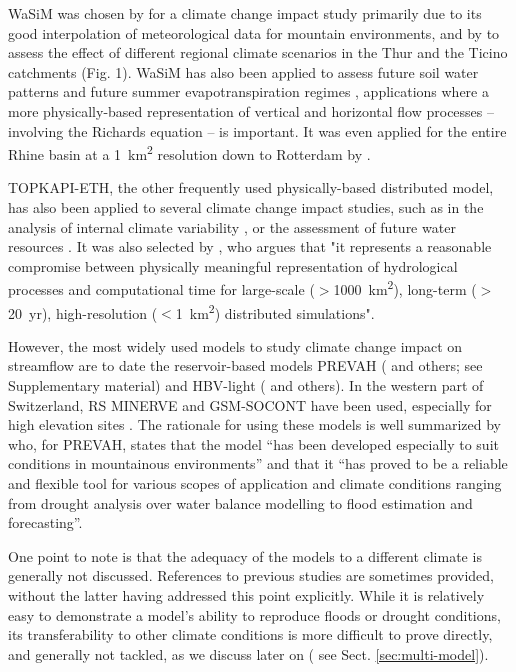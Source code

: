 \documentclass[10pt,a4paper]{article}
\begin{document}
WaSiM was chosen by \citet{Middelkoop2001} for a climate change impact study primarily due to its good interpolation of meteorological data for mountain environments, and by \citet{Jasper2004} to assess the effect of different regional climate scenarios in the Thur and the Ticino catchments (Fig. 1). WaSiM has also been applied to assess future soil water patterns \citep{Jasper2006, Rossler2012} and future summer evapotranspiration regimes \citep{Calanca2006}, applications where a more physically-based representation of vertical and horizontal flow processes -- involving the Richards equation -- is important. It was even applied for the entire Rhine basin at a 1~km\textsuperscript{2} resolution down to Rotterdam by \citet{Kleinn2005}.

TOPKAPI-ETH, the other frequently used physically-based distributed model, has also been applied to several climate change impact studies, such as in the analysis of internal climate variability \citep{Fatichi2014}, or the assessment of future water resources \citep{Finger2012}. It was also selected by \citet{Fatichi2015}, who argues that "it represents a reasonable compromise between physically meaningful representation of hydrological processes and computational time for large-scale ($>$1000~km\textsuperscript{2}), long-term ($>$20~yr), high-resolution ($<$1~km\textsuperscript{2}) distributed simulations".

However, the most widely used models to study climate change impact on streamflow are to date the reservoir-based models PREVAH (\citealt{Koplin2012, Speich2015, Milano2015a, Brunner2019c} and others;  see Supplementary material) and HBV-light (\citealt{Etter2017, Hakala2020, Brunner2018a, Jenicek2018}  and others). In the western part of Switzerland, RS MINERVE and GSM-SOCONT have been used, especially for high elevation sites \citep{Horton2006, Uhlmann2013a, Uhlmann2013b, Terrier2015}. The rationale for using these models is well summarized by \citet{Koplin2010} who, for PREVAH, states that the model ``has been developed especially to suit conditions in mountainous environments'' and that it ``has proved to be a reliable and flexible tool for various scopes of application and climate conditions ranging from drought analysis over water balance modelling to flood estimation and forecasting''. 

One point to note is that the adequacy of the models to a different climate is generally not discussed. References to previous studies are sometimes provided, without the latter having addressed this point explicitly. While it is relatively easy to demonstrate a model's ability to reproduce floods or drought conditions, its transferability to other climate conditions is more difficult to prove directly, and generally not tackled, as we discuss later on ( see Sect. \ref{sec:multi-model}). 
\end{document}
